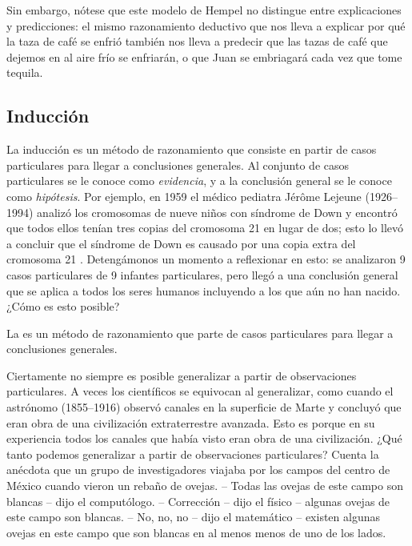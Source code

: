 Sin embargo, nótese que este modelo de Hempel no distingue entre explicaciones y
predicciones: el mismo razonamiento deductivo que nos lleva a explicar por qué
la taza de café se enfrió también nos lleva a predecir que las tazas de café que
dejemos en al aire frío se enfriarán, o que Juan se embriagará cada vez que
tome tequila.

\subsection*{Inducción}
\label{sub:induccion}
La inducción es un método de razonamiento que consiste en partir de casos
particulares para llegar a conclusiones generales.
Al conjunto de casos particulares se le conoce como \emph{evidencia}, y a la
conclusión general se le conoce como \emph{hipótesis}.
Por ejemplo, en 1959 el médico pediatra Jérôme Lejeune (1926--1994) analizó los
cromosomas de nueve niños con síndrome de Down y encontró que todos ellos tenían
tres copias del cromosoma 21 en lugar de dos; esto lo llevó a concluir que el
síndrome de Down es causado por una copia extra del cromosoma 21%
\cite{Lejeune1959}.
Detengámonos un momento a reflexionar en esto: se analizaron 9 casos
particulares de 9 infantes particulares, pero llegó a una conclusión general que
se aplica a todos los seres humanos incluyendo a los que aún no han nacido.
¿Cómo es esto posible?

\begin{remember}
    \label{rem:induccion}
    La  es un método de razonamiento que parte de casos
    particulares para llegar a conclusiones generales.
\end{remember}

Ciertamente no siempre es posible generalizar a partir de observaciones
particulares.
A veces los científicos se equivocan al generalizar, como cuando el astrónomo
 (1855--1916) observó canales en la
superficie de Marte y concluyó que eran obra de una civilización extraterrestre
avanzada.
Esto es porque en su experiencia todos los canales que había visto eran obra de
una civilización.
¿Qué tanto podemos generalizar a partir de observaciones particulares?
Cuenta la anécdota que un grupo de investigadores viajaba por los campos del
centro de México cuando vieron un rebaño de ovejas.
-- Todas las ovejas de este campo son blancas -- dijo el computólogo.
-- Corrección -- dijo el físico -- algunas ovejas de este campo son blancas.
-- No, no, no -- dijo el matemático -- existen algunas ovejas en este campo que
son blancas en al menos menos de uno de los lados.

